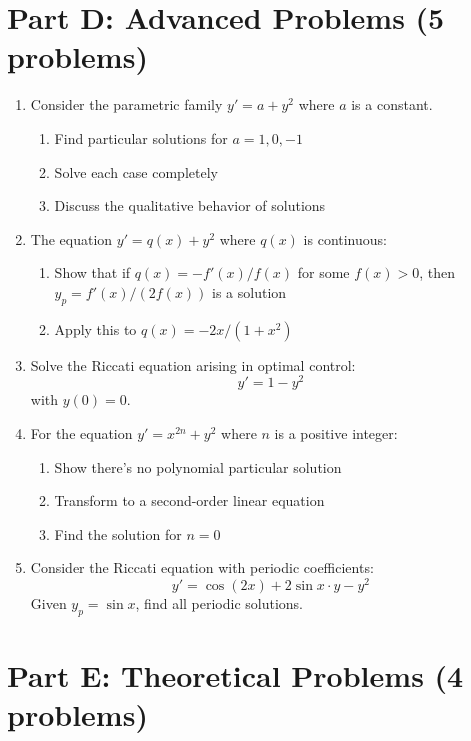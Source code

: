 \documentclass[12pt]{article}
\begin{document}
\section*{Part D: Advanced Problems (5 problems)}

\begin{enumerate}[resume]
    \item Consider the parametric family $y' = a + y^2$ where $a$ is a constant.
    \begin{enumerate}[label=(\alph*)]
        \item Find particular solutions for $a = 1, 0, -1$
        \item Solve each case completely
        \item Discuss the qualitative behavior of solutions
    \end{enumerate}

    \item The equation $y' = q(x) + y^2$ where $q(x)$ is continuous:
    \begin{enumerate}[label=(\alph*)]
        \item Show that if $q(x) = -f'(x)/f(x)$ for some $f(x) > 0$, then $y_p = f'(x)/(2f(x))$ is a solution
        \item Apply this to $q(x) = -2x/(1 + x^2)$
    \end{enumerate}

    \item Solve the Riccati equation arising in optimal control:
    $$y' = 1 - y^2$$
    with $y(0) = 0$.

    \item For the equation $y' = x^{2n} + y^2$ where $n$ is a positive integer:
    \begin{enumerate}[label=(\alph*)]
        \item Show there's no polynomial particular solution
        \item Transform to a second-order linear equation
        \item Find the solution for $n = 0$
    \end{enumerate}

    \item Consider the Riccati equation with periodic coefficients:
    $$y' = \cos(2x) + 2\sin x \cdot y - y^2$$
    Given $y_p = \sin x$, find all periodic solutions.
\end{enumerate}

\section*{Part E: Theoretical Problems (4 problems)}
\end{document}
